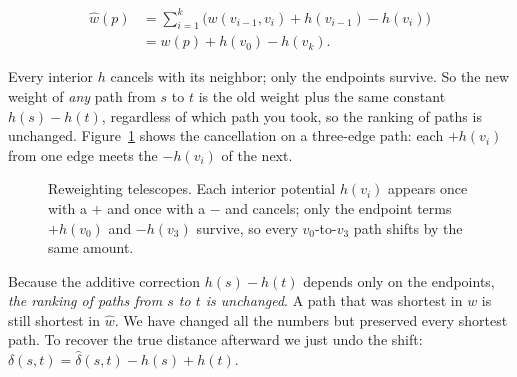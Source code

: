\begin{align*}
\hat{w}(p) &= \sum_{i=1}^{k}\big(w(v_{i-1}, v_i) + h(v_{i-1}) - h(v_i)\big) \\
&= w(p) + h(v_0) - h(v_k).
\end{align*}

Every interior $h$ cancels with its neighbor; only the endpoints survive. So
the new weight of \emph{any} path from $s$ to $t$ is the old weight plus the
same constant $h(s) - h(t)$, regardless of which path you took, so the
ranking of paths is unchanged. Figure~\ref{ch25:fig-telescope} shows the cancellation on a
three-edge path: each $+h(v_i)$ from one edge meets the $-h(v_i)$ of the next.

\begin{figure}[H]
\centering
{}
\caption{Reweighting telescopes. Each interior potential $h(v_i)$ appears once
with a $+$ and once with a $-$ and cancels; only the endpoint terms $+h(v_0)$
and $-h(v_3)$ survive, so every $v_0$-to-$v_3$ path shifts by the same amount.}
\label{ch25:fig-telescope}
\end{figure}

\begin{focusbox}
Because the additive correction $h(s) - h(t)$ depends only on the endpoints,
\emph{the ranking of paths from $s$ to $t$ is unchanged}. A path that was
shortest in $w$ is still shortest in $\hat{w}$. We have changed all the numbers
but preserved every shortest path. To recover the true distance afterward we
just undo the shift: $\delta(s,t) = \hat\delta(s,t) - h(s) + h(t)$.
\end{focusbox}

